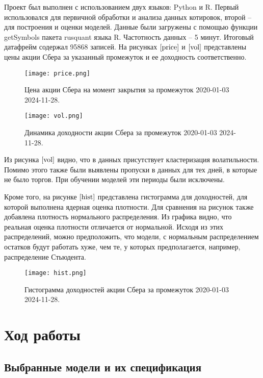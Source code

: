 \documentclass[]{article}
\begin{document}
Проект был выполнен с использованием двух языков: Python и R. Первый использовался для первичной обработки и анализа данных котировок, второй -- для построения и оценки моделей.
Данные были загружены с помощью функции getSymbols пакета rusquant языка R. Частотность данных -- 5 минут.
Итоговый датафрейм содержал 95868 записей. На рисунках $\ref{price}$ и $\ref{vol}$ представлены цены акции Сбера за указанный промежуток и ее доходность соответственно.

\begin{figure}[h!]
	\centering
	\texttt{[image: price.png]}
	\caption{Цена акции Сбера на момент закрытия за промежуток 2020-01-03 2024-11-28.}
	\label{price}
\end{figure}

\begin{figure}[h!]
	\centering
	\texttt{[image: vol.png]}
	\caption{Динамика доходности акции Сбера за промежуток 2020-01-03 2024-11-28.}
	\label{vol}
\end{figure}

Из рисунка $\ref{vol}$ видно, что в данных присутствует кластеризация волатильности. Помимо этого также были выявлены пропуски в данных для тех дней, в которые не было торгов. При обучении моделей эти периоды были исключены.

Кроме того, на рисунке $\ref{hist}$ представлена гистограмма для доходностей, для которой выполнена ядерная оценка плотности. Для сравнения на рисунок также добавлена плотность нормального распределения. Из графика видно, что реальная оценка плотности отличается от нормальной. Исходя из этих распределений, можно предположить, что модели, с нормальным распределением остатков будут работать хуже, чем те, у которых предполагается, например, распределение Стьюдента. 

\begin{figure}[h!]
	\centering
	\texttt{[image: hist.png]}
	\caption{Гистограмма доходностей акции Сбера за промежуток 2020-01-03 2024-11-28.}
	\label{hist}
\end{figure}




\section{Ход работы}
\subsection{Выбранные модели и их спецификация}
\end{document}

